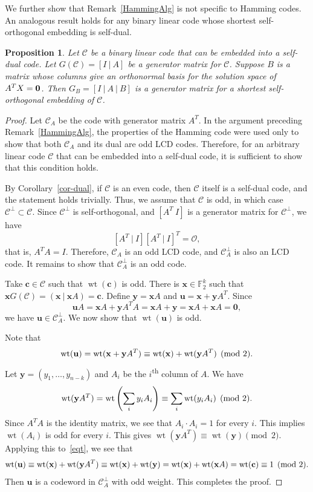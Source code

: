 \documentclass{article}
\newtheorem{prop}[theorem]{Proposition}
\theoremstyle{definition}
\theoremstyle{remark}
\newcommand{\wt}{\operatorname{wt}}
\begin{document}
We further show that Remark~\ref{HammingAlg} is not specific to Hamming codes. An analogous result holds for any binary linear code whose shortest self-orthogonal embedding is self-dual.
\begin{prop}
Let $\mathcal{C}$ be a binary linear code that can be embedded into a self-dual code. Let $G(\mathcal{C})=[I~|~A]$ be a generator matrix for $\mathcal{C}$.  Suppose $B$ is a matrix whose columns give an orthonormal basis for the solution space of $A^TX={\bf 0}$.  Then $G_B=[I~|~A~|~B]$ is a generator matrix for a shortest self-orthogonal embedding of $\mathcal{C}$.
\end{prop}
\begin{proof}
    Let $\mathcal{C}_A$ be the code with generator matrix $A^T$. In the argument preceding Remark~\ref{HammingAlg}, the properties of the Hamming code were used only to show that both $\mathcal{C}_A$ and its dual are odd LCD codes. Therefore, for an arbitrary linear code $\mathcal{C}$ that can be embedded into a self-dual code, it is sufficient to show that this condition holds.

    By Corollary~\ref{cor-dual}, if $\mathcal{C}$ is an even code, then $\mathcal{C}$ itself is a self-dual code, and the statement holds trivially. Thus, we assume that $\mathcal{C}$ is odd, in which case $\mathcal{C}^\perp\subset \mathcal{C}$. Since $\mathcal{C}^\perp$ is self-orthogonal, and $[A^T~I]$ is a generator matrix for $\mathcal{C}^\perp$, we have
    \[
    [A^T~|~I] [A^T~|~I]^T= \mathcal{O},
  \]
  that is, $A^TA=I$. Therefore, $\mathcal{C}_A$ is an odd LCD code, and $\mathcal{C}_A^\perp$ is also an LCD code. It remains to show that $\mathcal{C}_A^\perp$ is an odd code.

  Take $\mathbf{c}\in\mathcal{C}$ such that $\wt(\mathbf{c})$ is odd. There is $\mathbf{x}\in\mathbb{F}_2^k$ such that $\mathbf{x}G(\mathcal{C})=(\mathbf{x}~|~\mathbf{x}A)=\mathbf{c}$. Define $\mathbf{y}=\mathbf{x}A$ and $\mathbf{u}=\mathbf{x}+\mathbf{y}A^T$. Since
  \[
  \mathbf{u}A=\mathbf{x}A+\mathbf{y}A^TA=\mathbf{x}A+\mathbf{y}=\mathbf{x}A+\mathbf{x}A=\mathbf{0},
  \]
  we have $\mathbf{u}\in\mathcal{C}_A^\perp$. We now show that $\wt(\mathbf{u})$ is odd.


  Note that
  \begin{equation}\label{eqt}
  {\rm wt}(\mathbf{u})={\rm wt}(\mathbf{x}+\mathbf{y}A^T)\equiv {\rm wt}(\mathbf{x})+{\rm wt}(\mathbf{y}A^T)\pmod 2.
  \end{equation}
  Let $\mathbf{y}=(y_1, \ldots, y_{n-k})$ and $A_i$ be the $i$\textsuperscript{th} column of $A$. We have
  \[
  {\rm wt}(\mathbf{y}A^T)={\rm wt}\left(\sum_i y_iA_i\right)\equiv\sum_i{\rm wt}(y_iA_i)\pmod 2.
  \]
  Since $A^T A$ is the identity matrix, we see that $A_i\cdot A_i=1$ for every $i$.  This implies $\wt(A_i)$ is odd for every $i$. This gives $\wt(\mathbf{y}A^T)\equiv \wt(\mathbf{y})\pmod 2$. Applying this to~\eqref{eqt}, we see that
  \[
  {\rm wt}(\mathbf{u})\equiv {\rm wt}(\mathbf{x})+{\rm wt}(\mathbf{y}A^T)\equiv {\rm wt}(\mathbf{x})+{\rm wt}(\mathbf{y})={\rm wt}(\mathbf{x})+{\rm wt}(\mathbf{x}A)={\rm wt}(\mathbf{c})\equiv 1\pmod 2.
  \]
  Then $\mathbf{u}$ is a codeword in $\mathcal{C}_A^\perp$ with odd weight. This completes the proof.
\end{proof}
\end{document}
